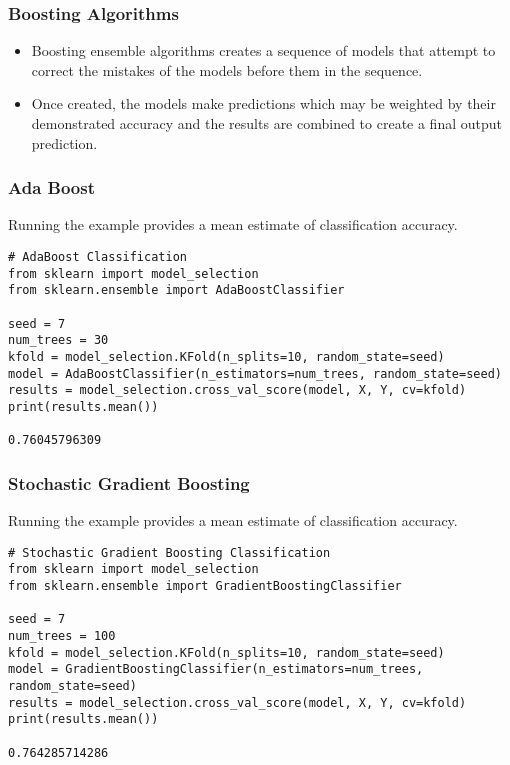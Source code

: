\begin{frame}[fragile]\frametitle{Boosting Algorithms}

	\begin{itemize}
	\item Boosting ensemble algorithms creates a sequence of models that attempt to correct the mistakes of the models before them in the sequence.
	\item Once created, the models make predictions which may be weighted by their demonstrated accuracy and the results are combined to create a final output prediction.
	\end{itemize}
	
\end{frame}


\begin{frame}[fragile]\frametitle{Ada Boost}
Running the example provides a mean estimate of classification accuracy.

\begin{lstlisting}
# AdaBoost Classification
from sklearn import model_selection
from sklearn.ensemble import AdaBoostClassifier

seed = 7
num_trees = 30
kfold = model_selection.KFold(n_splits=10, random_state=seed)
model = AdaBoostClassifier(n_estimators=num_trees, random_state=seed)
results = model_selection.cross_val_score(model, X, Y, cv=kfold)
print(results.mean())

0.76045796309
\end{lstlisting}
\end{frame}



\begin{frame}[fragile]\frametitle{Stochastic Gradient Boosting}
Running the example provides a mean estimate of classification accuracy.

\begin{lstlisting}
# Stochastic Gradient Boosting Classification
from sklearn import model_selection
from sklearn.ensemble import GradientBoostingClassifier

seed = 7
num_trees = 100
kfold = model_selection.KFold(n_splits=10, random_state=seed)
model = GradientBoostingClassifier(n_estimators=num_trees, random_state=seed)
results = model_selection.cross_val_score(model, X, Y, cv=kfold)
print(results.mean())

0.764285714286
\end{lstlisting}
\end{frame}

